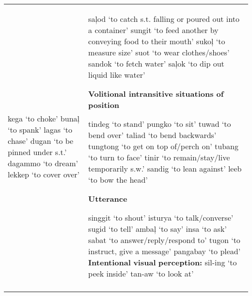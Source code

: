 \begin{table}
\begin{tabular} {
        >{\RaggedRight\arraybackslash}p{5.6cm}
        >{\RaggedRight\arraybackslash}p{5.6cm}
                    }
kega ‘to choke’\newline 
bunaļ ‘to spank’\newline
lagas ‘to chase’\newline 
dugan ‘to be pinned under s.t.’\newline
dagammo ‘to dream’\newline 
lekkep ‘to cover over’ %
&
saļod ‘to catch s.t. falling or poured out into a container’\newline
sungit ‘to feed another by conveying food to their mouth’\newline 
sukoļ ‘to measure size’\newline
suot ‘to wear clothes/shoes’\newline
sandok ‘to fetch water’\newline 
saļok ‘to dip out liquid like water’\newline

{\bfseries Volitional intransitive situations of position}\newline

tindeg ‘to stand’\newline 
pungko ‘to sit’\newline
tuwad ‘to bend over’\newline
taliad ‘to bend backwards’\newline 
tungtong ‘to get on top of/perch on’\newline 
tubang ‘to turn to face’\newline 
tinir ‘to remain/stay/live temporarily s.w.’\newline
sandig ‘to lean against’\newline
leeb ‘to bow the head’\newline 

{\bfseries Utterance}\newline

singgit ‘to shout’\newline 
isturya ‘to talk/converse’\newline 
sugid ‘to tell’\newline 
ambaļ ‘to say’\newline
insa ‘to ask’\newline 
sabat ‘to answer/reply/respond to’\newline 
tugon ‘to instruct, give a message’\newline 
pangabay ‘to plead’\newline 
\textbf{Intentional} \textbf{visual} \textbf{perception:}\newline 
sil-ing ‘to peek inside’\newline 
tan-aw ‘to look at’\\ %
\lspbottomrule
\end{tabular}
\end{table}

